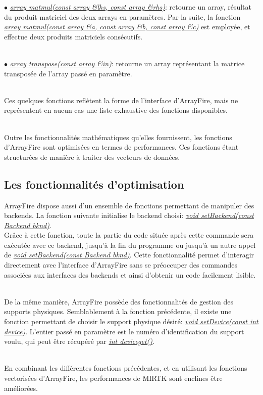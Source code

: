 \documentclass[10pt]{report}
\begin{document}
	{$\bullet$} \underline{\textit{array matmul(const array \&lhs, const array \&rhs)}}: retourne un array, résultat du produit matriciel des deux arrays en paramètres. Par la suite, la fonction \underline{\textit{array matmul(const array \&a, const array \&b, const array \&c)}} est employée, et effectue deux produits matriciels consécutifs. \\~\par
	{$\bullet$} \textit{\underline{array transpose(const array \&in)}}: retourne un array représentant la matrice transposée de l'array passé en paramètre.\\~\par
	
	Ces quelques fonctions reflètent la forme de l'interface d'ArrayFire, mais ne représentent en aucun cas une liste exhaustive des fonctions disponibles.\\~\par
	Outre les fonctionnalités mathématiques qu'elles fournissent, les fonctions d'ArrayFire sont optimisées en termes de performances. Ces fonctions étant structurées de manière à traiter des vecteurs de données.  
	
	\subsection{Les fonctionnalités d'optimisation}
	
	ArrayFire dispose aussi d'un ensemble de fonctions permettant de manipuler des backends. La fonction suivante initialise le backend choisi:
	\underline{\textit{void setBackend(const Backend bknd)}}. \\Grâce à cette fonction, toute la partie du code située après cette commande sera exécutée avec ce backend, jusqu'à la fin du programme ou jusqu'à un autre appel de \underline{\textit{void setBackend(const Backend bknd)}}. Cette fonctionnalité permet d'interagir directement avec l'interface d'ArrayFire sans se préoccuper des commandes associées aux interfaces des backends et ainsi d'obtenir un code facilement lisible.\\~\par
	De la même manière, ArrayFire possède des fonctionnalités de gestion des supports physiques. Semblablement à la fonction précédente, il existe une fonction permettant de choisir le support physique désiré: \textit{\underline{void setDevice(const int device)}}. L'entier passé en paramètre est le numéro d'identification du support voulu, qui peut être récupéré par \underline{\textit{int deviceget()}}.\\~\par
	En combinant les différentes fonctions précédentes, et en utilisant les fonctions vectorisées d'ArrayFire, les performances de MIRTK sont enclines être améliorées.
	
\end{document}
